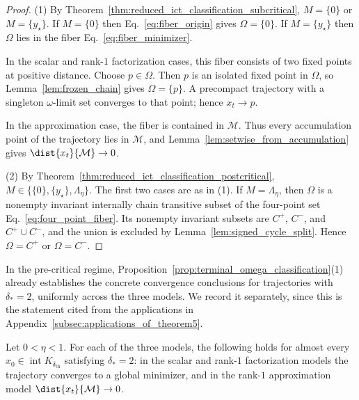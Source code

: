 \documentclass{article}
\begin{document}
\begin{proof}
(1) By Theorem~\ref{thm:reduced_ict_classification_subcritical},
$M=\{0\}$ or $M=\{y_\star\}$. If $M=\{0\}$ then
Eq.~\eqref{eq:fiber_origin} gives $\Omega=\{0\}$. If $M=\{y_\star\}$ then
$\Omega$ lies in the fiber Eq.~\eqref{eq:fiber_minimizer}.

In the scalar and rank-$1$ factorization cases, this fiber consists of two fixed
points at positive distance. Choose $p\in\Omega$. Then $p$ is an isolated fixed
point in $\Omega$, so Lemma~\ref{lem:frozen_chain} gives $\Omega=\{p\}$. A
precompact trajectory with a singleton $\omega$-limit set converges to that
point; hence $x_t\to p$.

In the approximation case, the fiber is contained in $\mathcal M$. Thus every
accumulation point of the trajectory lies in $\mathcal M$, and
Lemma~\ref{lem:setwise_from_accumulation} gives
$\dist{x_t}{\mathcal M}\to0$.

(2) By Theorem~\ref{thm:reduced_ict_classification_postcritical},
$M\in\{\{0\},\{y_\star\},\Lambda_\eta\}$. The first two cases are as in (1). If
$M=\Lambda_\eta$, then $\Omega$ is a nonempty invariant internally chain
transitive subset of the four-point set Eq.~\eqref{eq:four_point_fiber}. Its
nonempty invariant subsets are $C^+$, $C^-$, and $C^+\cup C^-$, and the union is
excluded by Lemma~\ref{lem:signed_cycle_split}. Hence $\Omega=C^+$ or
$\Omega=C^-$.
\end{proof}

In the pre-critical regime, Proposition~\ref{prop:terminal_omega_classification}(1)
already establishes the concrete convergence conclusions for trajectories with
$\delta_\ast=2$, uniformly across the three models. We record it separately,
since this is the statement cited from the applications in
Appendix~\ref{subsec:applications_of_theorem5}.

\begin{corollary}
\label{cor:subcritical_terminal_inheritance}
Let $0<\eta<1$. For each of the three models, the following holds for almost
every $x_0\in\operatorname{int}K_{\delta_{\mathrm{th}}}$ satisfying
$\delta_\ast=2$: in the scalar and rank-$1$ factorization models the trajectory
converges to a global minimizer, and in the rank-$1$ approximation model
$\dist{x_t}{\mathcal M}\to0$.
\end{corollary}
\end{document}

